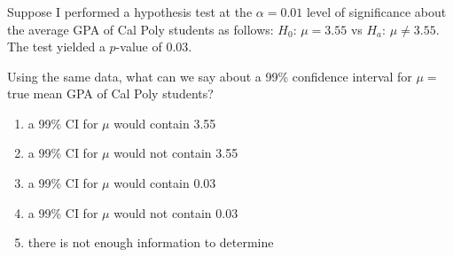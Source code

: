 \begin{frame}
\frametitle{\grp}
Suppose I performed a hypothesis test at the $\alpha=0.01$ level of significance about the average GPA of Cal Poly students as follows: $H_0$: $\mu=3.55$ vs $H_a$: $\mu\neq3.55$.  The test yielded a $p$-value of 0.03.
\begin{clicker}{Using the same data, what can we say about a 99\% confidence interval for $\mu=$true mean GPA of Cal Poly students?}
\begin{enumerate}
    \item
    a 99\% CI for $\mu$ would contain 3.55
    \item
    a 99\% CI for $\mu$ would not contain 3.55
    \item
    a 99\% CI for $\mu$ would contain 0.03
    \item
    a 99\% CI for $\mu$ would not contain 0.03
    \item
    there is not enough information to determine
\end{enumerate}
\end{clicker}
\end{frame}



%
%



